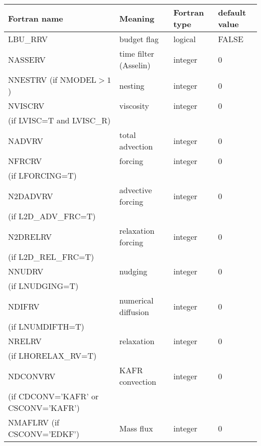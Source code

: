 \begin{longtable} {|p{}|p{}|>{\centering}p{}|p{}<{\centering}|}
\hline
Fortran name & Meaning & Fortran type & default value \\
\hline \hline
\endhead
LBU\_RRV & budget flag & logical & FALSE\index{LBU\_RRV!\innam{NAM\_BU\_RRV}} \\\hline
NASSERV  & time filter (Asselin)   & integer  &  0 \index{NASSERV!\innam{NAM\_BU\_RRV}} \\\hline
NNESTRV (if NMODEL$>1$) & nesting           & integer  &  0 \index{NNESTRV!\innam{NAM\_BU\_RRV}} \\\hline
NVISCRV  & viscosity         & integer  &  0 \index{NVISCRV!\innam{NAM\_BU\_RRV}}\\
(if LVISC=T and LVISC\_R) &  &   &   \\\hline
NADVRV   & total advection   & integer  &  0 \index{NADVRV!\innam{NAM\_BU\_RRV}}\\\hline
NFRCRV   & forcing           & integer  &  0 \index{NFRCRV!\innam{NAM\_BU\_RRV}} \\ \nopagebreak
(if LFORCING=T) &  &   &   \\\hline
N2DADVRV   &advective forcing           & integer  &  0 \index{N2DADVRV!\innam{NAM\_BU\_RRV}} \\ \nopagebreak
(if L2D\_ADV\_FRC=T) &  &   &   \\\hline
N2DRELRV   & relaxation forcing           & integer  &  0 \index{N2DRLERV!\innam{NAM\_BU\_RRV}} \\ \nopagebreak
(if L2D\_REL\_FRC=T) &  &   &   \\\hline
NNUDRV   & nudging           & integer  &  0 \index{NNUDRV!\innam{NAM\_BU\_RRV}} \\ \nopagebreak
(if LNUDGING=T) &  &   &   \\\hline
NDIFRV   & numerical diffusion & integer  &  0 \index{NDIFRV!\innam{NAM\_BU\_RRV}}\\ \nopagebreak
(if LNUMDIFTH=T) &  &   &   \\\hline
NRELRV   & relaxation        & integer  &  0 \index{NRELRV!\innam{NAM\_BU\_RRV}}\\ \nopagebreak
(if LHORELAX\_RV=T) &  &   &   \\\hline
NDCONVRV  & KAFR convection   & integer  &  0 \index{NDCONVRV!\innam{NAM\_BU\_RRV}}\\ \nopagebreak
(if CDCONV='KAFR' or CSCONV='KAFR') &  &   &   \\\hline
NMAFLRV (if CSCONV='EDKF') & Mass flux & integer  &  0 \index{NMAFLRV!\innam{NAM\_BU\_RRV}} \\\hline

\end{longtable}
